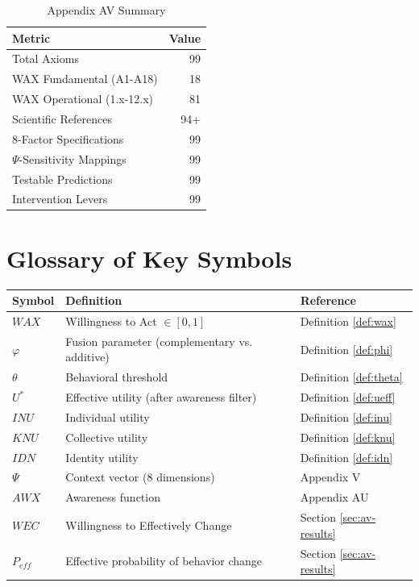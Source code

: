 \begin{table}[htbp]
\centering
\caption{Appendix AV Summary}
\label{tab:av-summary}
\renewcommand{\arraystretch}{1.3}
\begin{tabular}{@{}lr@{}}
\toprule
\textbf{Metric} & \textbf{Value} \\
\midrule
Total Axioms & 99 \\
\quad WAX Fundamental (A1-A18) & 18 \\
\quad WAX Operational (1.x-12.x) & 81 \\
Scientific References & 94+ \\
8-Factor Specifications & 99 \\
$\Psi$-Sensitivity Mappings & 99 \\
Testable Predictions & 99 \\
Intervention Levers & 99 \\
\bottomrule
\end{tabular}
\end{table}



\section{Glossary of Key Symbols}
\label{sec:av-glossary}

\begin{center}
\renewcommand{\arraystretch}{1.3}
\begin{tabular}{@{}lll@{}}
\toprule
\textbf{Symbol} & \textbf{Definition} & \textbf{Reference} \\
\midrule
$WAX$ & Willingness to Act $\in [0,1]$ & Definition \ref{def:wax} \\
$\varphi$ & Fusion parameter (complementary vs. additive) & Definition \ref{def:phi} \\
$\theta$ & Behavioral threshold & Definition \ref{def:theta} \\
$U^*$ & Effective utility (after awareness filter) & Definition \ref{def:ueff} \\
$INU$ & Individual utility & Definition \ref{def:inu} \\
$KNU$ & Collective utility & Definition \ref{def:knu} \\
$IDN$ & Identity utility & Definition \ref{def:idn} \\
$\Psi$ & Context vector (8 dimensions) & Appendix V \\
$AWX$ & Awareness function & Appendix AU \\
$WEC$ & Willingness to Effectively Change & Section \ref{sec:av-results} \\
$P_{eff}$ & Effective probability of behavior change & Section \ref{sec:av-results} \\
\bottomrule
\end{tabular}
\end{center}

